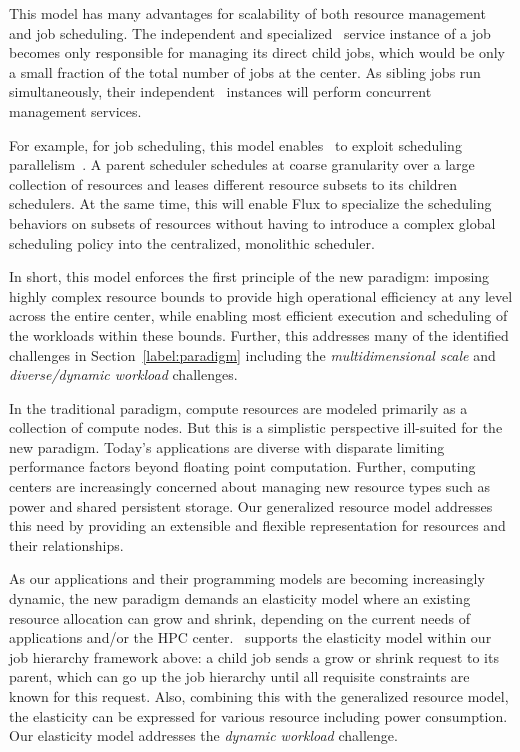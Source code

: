 This model has many advantages for scalability of both
resource management and job scheduling. 
The independent and specialized \flux\ service instance
of a job becomes only responsible for managing its direct
child jobs, which would be only a small fraction of
the total number of jobs at the center. 
As sibling jobs run simultaneously, their independent
\flux\ instances will perform concurrent management services.

For example, for job scheduling, this model enables \flux\
to exploit scheduling parallelism~\cite{Omega,Mesos}.
A parent scheduler schedules at coarse granularity 
over a large collection of resources and leases different resource subsets 
to its children schedulers. 
At the same time, this will enable Flux to specialize the scheduling behaviors 
on subsets of resources without having to introduce a
complex global scheduling policy into the centralized, monolithic scheduler. 

In short, this model enforces the first principle 
of the new paradigm: imposing highly complex resource bounds 
to provide high operational efficiency 
at any level across the entire center, while enabling 
most efficient execution and scheduling of the workloads 
within these bounds. 
Further, this addresses 
many of the identified challenges in Section~\ref{label:paradigm} 
including the {\em multidimensional scale} and 
{\em diverse/dynamic workload} challenges. 

 In the traditional 
paradigm, compute resources are modeled primarily 
as a collection of compute nodes. But this is a simplistic perspective 
ill-suited for the new paradigm. Today's applications 
are diverse with disparate limiting performance factors 
beyond floating point computation. 
Further, computing centers are increasingly concerned 
about managing new resource types such as power 
and shared persistent storage. Our generalized resource
model addresses this need by providing an extensible
and flexible representation for resources
and their relationships.

 As our 
applications and their programming models are becoming 
increasingly dynamic, the new paradigm demands 
an elasticity model where an existing resource allocation 
can grow and shrink, depending on the current needs 
of applications and/or the HPC center. 
\flux\ supports the elasticity model within our job hierarchy 
framework above: a child job sends a grow or shrink request 
to its parent, which can go up the job hierarchy 
until all requisite constraints are known for this request. 
Also, combining this with the generalized resource model, 
the elasticity can be expressed for various resource including 
power consumption. Our elasticity model addresses 
the {\em dynamic workload} challenge.

